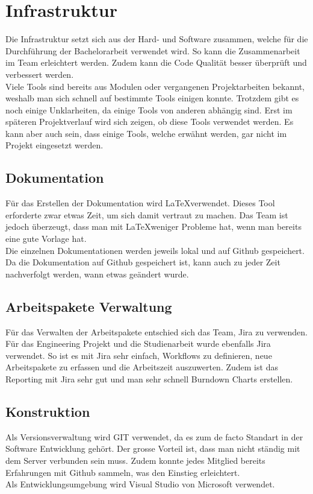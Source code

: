 \section{Infrastruktur}
Die Infrastruktur setzt sich aus der Hard- und Software zusammen, welche für die Durchführung der Bachelorarbeit verwendet wird. So kann die Zusammenarbeit im Team erleichtert werden. Zudem kann die Code Qualität besser überprüft und verbessert werden.
\\
Viele Tools sind bereits aus Modulen oder vergangenen Projektarbeiten bekannt, weshalb man sich schnell auf bestimmte Tools einigen konnte. Trotzdem gibt es noch einige Unklarheiten, da einige Tools von anderen abhängig sind. Erst im späteren Projektverlauf wird sich zeigen, ob diese Tools verwendet werden. Es kann aber auch sein, dass einige Tools, welche erwähnt werden, gar nicht im Projekt eingesetzt werden.

\subsection{Dokumentation}
Für das Erstellen der Dokumentation wird \LaTeX verwendet. Dieses Tool erforderte zwar etwas Zeit, um sich damit vertraut zu machen. Das Team ist jedoch überzeugt, dass man mit \LaTeX weniger Probleme hat, wenn man bereits eine gute Vorlage hat.
\\
Die einzelnen Dokumentationen werden jeweils lokal und auf Github gespeichert. Da die Dokumentation auf Github gespeichert ist, kann auch zu jeder Zeit nachverfolgt werden, wann etwas geändert wurde.

\subsection{Arbeitspakete Verwaltung}
Für das Verwalten der Arbeitspakete entschied sich das Team, Jira zu verwenden. Für das Engineering Projekt und die Studienarbeit wurde ebenfalls Jira verwendet. So ist es mit Jira sehr einfach, Workflows zu definieren, neue Arbeitspakete zu erfassen und die Arbeitszeit auszuwerten. Zudem ist das Reporting mit Jira sehr gut und man sehr schnell Burndown Charts erstellen.

\subsection{Konstruktion}
Als Versionsverwaltung wird GIT verwendet, da es zum de facto Standart in der Software Entwicklung gehört. Der grosse Vorteil ist, dass man nicht ständig mit dem Server verbunden sein muss. Zudem konnte jedes Mitglied bereits Erfahrungen mit Github sammeln, was den Einstieg erleichtert.
\\
Als Entwicklungsumgebung wird Visual Studio von Microsoft verwendet.

